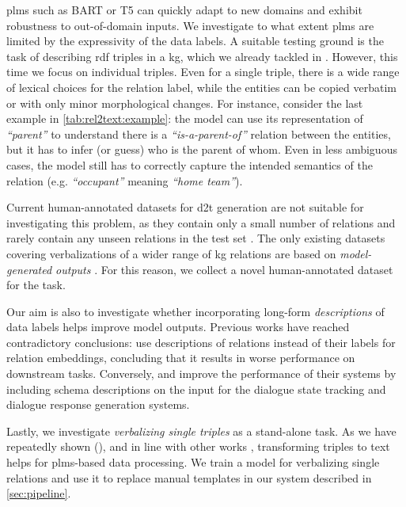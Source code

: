 \acp{plm} such as BART \cite{lewisBARTDenoisingSequencetoSequence2019} or T5 \cite{raffelExploringLimitsTransfer2019} can quickly adapt to new domains and exhibit robustness to out-of-domain inputs. We investigate to what extent \acp{plm} are limited by the expressivity of the data labels. A suitable testing ground is the task of describing \acs{rdf} triples in a \ac{kg}, which we already tackled in . However, this time we focus on individual triples. Even for a single triple, there is a wide range of lexical choices for the relation label, while the entities can be copied verbatim or with only minor morphological changes. For instance, consider the last example in \autoref{tab:rel2text:example}: the model can use its representation of \emph{``parent''} to understand there is a \emph{``is-a-parent-of''} relation between the entities, but it has to infer (or guess) who is the parent of whom. Even in less ambiguous cases, the model still has to correctly capture the intended semantics of the relation (e.g. \emph{``occupant''} meaning \emph{``home team''}).


Current human-annotated datasets for \ac{d2t} generation are not suitable for investigating this problem, as they contain only a small number of relations and rarely contain any unseen relations in the test set \cite{mille2021automatic}. The only existing datasets covering verbalizations of a wider range of \ac{kg} relations are based on \emph{model-generated outputs} \cite{agarwalKnowledgeGraphBased2021,amaral2022wdv}. For this reason, we collect a novel human-annotated dataset for the task.

Our aim is also to investigate whether incorporating long-form \emph{descriptions} of data labels helps improve model outputs. Previous works have reached contradictory conclusions: \citet{wang2021kepler} use descriptions of relations instead of their labels for relation embeddings, concluding that it results in worse performance on downstream tasks. Conversely, \citet{kale-rastogi-2020-template} and \citet{lee2021dialogue} improve the performance of their systems by including schema descriptions on the input for the dialogue state tracking and dialogue response generation systems.

Lastly, we investigate \emph{verbalizing single triples} as a stand-alone task. As we have repeatedly shown (), and in line with other works \cite{xiangASDOTAnyShotDatatoText2022,kale-rastogi-2020-template,gupta2020infotabs,neeraja2021incorporating}, transforming triples to text helps for \acp{plm}-based data processing. We train a model for verbalizing single relations and use it to replace manual templates in our system described in \autoref{sec:pipeline}.

